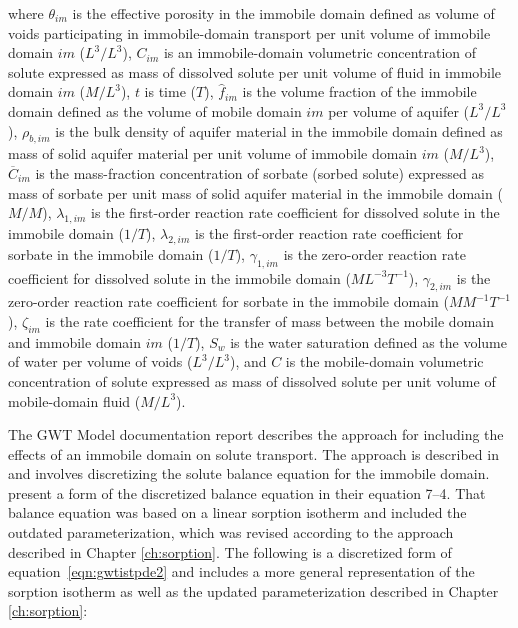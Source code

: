 \noindent where 
$\theta_{im}$ is the effective porosity in the immobile domain defined as volume of voids participating in immobile-domain transport per unit volume of immobile domain $im$ ($L^3/L^3$),
$C_{im}$ is an immobile-domain volumetric concentration of solute expressed as mass of dissolved solute per unit volume of fluid in immobile domain $im$ ($M/L^3$),
$t$ is time ($T$),
$\hat{f}_{im}$ is the volume fraction of the immobile domain defined as the volume of mobile domain $im$ per volume of aquifer ($L^3/L^3$),
$\rho_{b,im}$ is the bulk density of aquifer material in the immobile domain defined as mass of solid aquifer material per unit volume of immobile domain $im$ ($M/L^3$), 
$\overline{C}_{im}$ is the mass-fraction concentration of sorbate (sorbed solute) expressed as mass of sorbate per unit mass of solid aquifer material in the immobile domain ($M/M$), 
$\lambda_{1,im}$ is the first-order reaction rate coefficient for dissolved solute in the immobile domain ($1/T$), 
$\lambda_{2,im}$ is the first-order reaction rate coefficient for sorbate in the immobile domain ($1/T$), 
$\gamma_{1,im}$ is the zero-order reaction rate coefficient for dissolved solute in the immobile domain ($ML^{-3}T^{-1}$), 
$\gamma_{2,im}$ is the zero-order reaction rate coefficient for sorbate in the immobile domain ($M M^{-1}T^{-1}$), 
$\zeta_{im}$ is the rate coefficient for the transfer of mass between the mobile domain and immobile domain $im$ ($1/T$),
$S_w$ is the water saturation defined as the volume of water per volume of voids ($L^3/L^3$), 
and $C$ is the mobile-domain volumetric concentration of solute expressed as mass of dissolved solute per unit volume of mobile-domain fluid ($M/L^3$).

The GWT Model documentation report \citep{modflow6gwt} describes the approach for including the effects of an immobile domain on solute transport.   The approach is described in \cite{zheng2002} and involves discretizing the solute balance equation for the immobile domain.  \cite{modflow6gwt} present a form of the discretized balance equation in their equation 7--4.  That balance equation was based on a linear sorption isotherm and included the outdated parameterization, which was revised according to the approach described in Chapter \ref{ch:sorption}.  The following is a discretized form of equation~\ref{eqn:gwtistpde2} and includes a more general representation of the sorption isotherm as well as the updated parameterization described in Chapter \ref{ch:sorption}:

